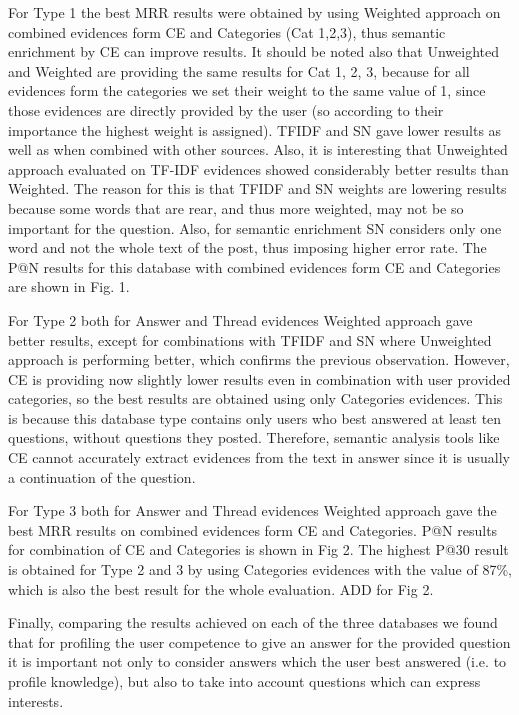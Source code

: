 \documentclass[conference]{IEEEtran}
\begin{document}
For Type 1 the best MRR results were obtained by using Weighted approach on combined evidences form CE and Categories (Cat 1,2,3), thus semantic enrichment by CE can improve results. It should be noted also that Unweighted and Weighted are providing the same results for Cat 1, 2, 3, because for all evidences form the categories we set their weight to the same value of 1, since those evidences are directly provided by the user (so according to their importance the highest weight is assigned). TFIDF and SN gave lower results as well as when combined with other sources. Also, it is interesting that Unweighted approach evaluated on TF-IDF evidences showed considerably better results than Weighted. The reason for this is that TFIDF and SN weights are lowering results because some words that are rear, and thus more weighted, may not be so important for the question. Also, for semantic enrichment SN considers only one word and not the whole text of the post, thus imposing higher error rate. The P@N results for this database with combined evidences form CE and Categories are shown in Fig. 1.

For Type 2 both for Answer and Thread evidences Weighted approach gave better results, except for combinations with TFIDF and SN where Unweighted approach is performing better, which confirms the previous observation.  However, CE is providing now slightly lower results even in combination with user provided categories, so the best results are obtained using only Categories evidences. This is because this database type contains only users who best answered at least ten questions, without questions they posted.  Therefore, semantic analysis tools like CE cannot accurately extract evidences from the text in answer since it is usually a continuation of the question.

For Type 3 both for Answer and Thread evidences Weighted approach gave the best MRR results on combined evidences form CE and Categories. P@N results for combination of CE and Categories is shown in Fig 2. The highest P@30 result is obtained for Type 2 and 3 by using Categories evidences with the value of 87\%, which is also the best result for the whole evaluation. ADD for Fig 2.

Finally, comparing the results achieved on each of the three databases we found that for profiling the user competence to give an answer for the provided question it is important not only to consider answers which the user best answered (i.e. to profile knowledge), but also to take into account  questions which can express interests.
	
\end{document}
